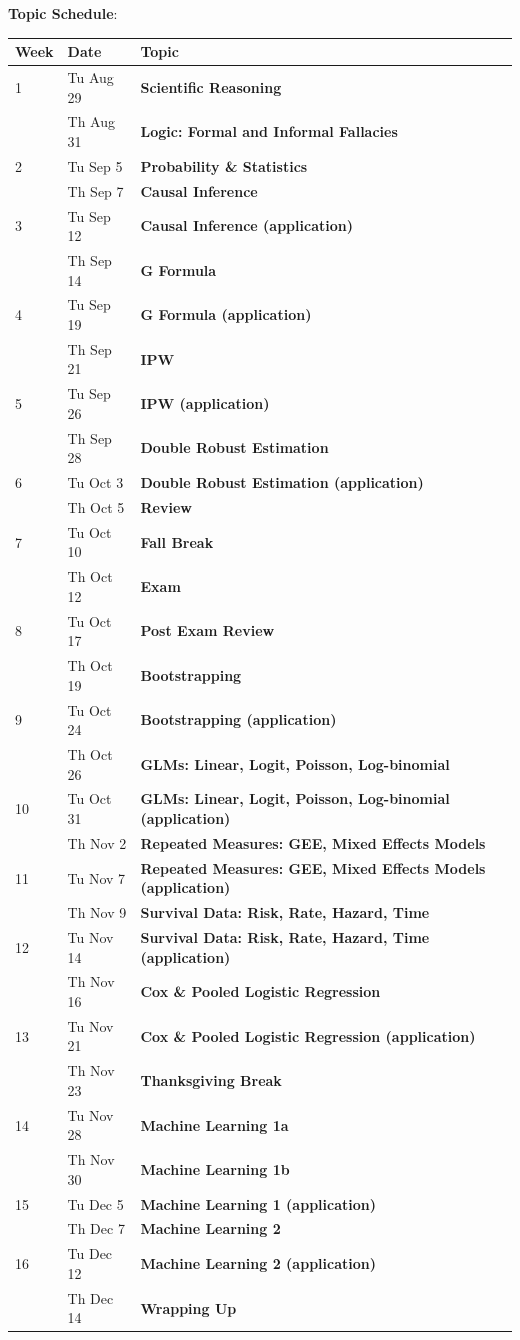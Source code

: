 \documentclass[12pt]{article}
\begin{document}
{\bf Topic Schedule}:\\
\bgroup
\def\arraystretch{1.25}%
\begin{tabular}[t]{|l|l|p{15cm}|}
\hline
Week & Date & Topic \\
\hline
1 & Tu Aug 29 & {\bf Scientific Reasoning} \\
  & Th Aug 31 & {\bf Logic: Formal and Informal Fallacies} \\
 \hline
2 & Tu Sep 5  & {\bf Probability \& Statistics} \\
  &  Th Sep 7	  & {\bf Causal Inference} \\
 \hline
3 &	Tu Sep 12 & {\bf Causal Inference (application)}\\
  & Th Sep 14 & {\bf G Formula}\\
\hline 
4 & Tu Sep 19 & {\bf G Formula (application)}\\
  & Th Sep 21 & {\bf IPW}\\
\hline 
5 & Tu Sep 26 & {\bf IPW (application)}\\
  & Th Sep 28 & {\bf Double Robust Estimation}\\
\hline
6 & Tu Oct 3 & {\bf  Double Robust Estimation (application)}\\
  & Th Oct 5	 & {\bf Review} \\
\hline
7 &	Tu Oct 10 & {\bf Fall Break}\\
  & Th Oct 12 & {\bf Exam}\\
\hline
8 & Tu Oct 17 & {\bf Post Exam Review}\\
  & Th Oct 19 & {\bf Bootstrapping}\\
\hline
9 & Tu Oct 24 & {\bf Bootstrapping (application) }\\
  & Th Oct 26 & {\bf GLMs: Linear, Logit, Poisson, Log-binomial}\\
\hline
10 & Tu Oct 31 & {\bf GLMs: Linear, Logit, Poisson, Log-binomial (application)}\\
   & Th Nov 2 & {\bf Repeated Measures: GEE, Mixed Effects Models}\\
\hline
11 & Tu Nov 7 & {\bf Repeated Measures: GEE, Mixed Effects Models (application)}\\
   & Th Nov 9 & {\bf Survival Data: Risk, Rate, Hazard, Time}\\
\hline
12 & Tu Nov 14 & {\bf Survival Data: Risk, Rate, Hazard, Time (application)}\\
   & Th Nov 16 & {\bf Cox \& Pooled Logistic Regression}\\
\hline
13 & Tu Nov 21 & {\bf  Cox \& Pooled Logistic Regression (application)}\\
   & Th Nov 23 & {\bf Thanksgiving Break}\\
\hline
14 & Tu Nov 28 & {\bf Machine Learning 1a}\\
   & Th Nov 30 & {\bf Machine Learning 1b}\\
\hline
15 & Tu Dec 5 & {\bf Machine Learning 1 (application)}\\
   & Th Dec 7 & {\bf Machine Learning 2}\\
\hline
16 & Tu Dec 12 & {\bf Machine Learning 2 (application)}\\
   & Th Dec 14 & {\bf Wrapping Up}\\
 \hline
\end{tabular}
\egroup
\end{document}
